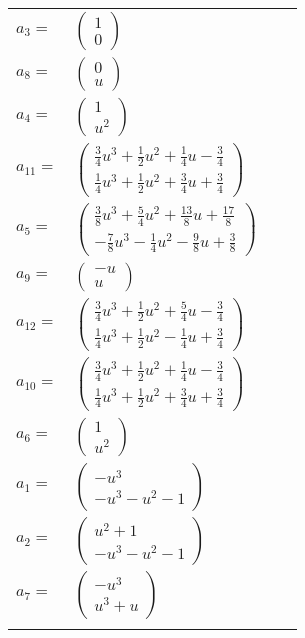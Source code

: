 \documentclass[1p]{elsarticle_modified}
\theoremstyle{definition}
\begin{document}
\begin{tabular}{m{7pt} m{180pt} m{7pt} m{180pt} }
\flushright $a_{3}=$&$\begin{pmatrix}1\\0\end{pmatrix}$ \\
\flushright $a_{8}=$&$\begin{pmatrix}0\\u\end{pmatrix}$ \\
\flushright $a_{4}=$&$\begin{pmatrix}1\\u^2\end{pmatrix}$ \\
\flushright $a_{11}=$&$\begin{pmatrix}\frac{3}{4} u^3+\frac{1}{2} u^2+\frac{1}{4} u-\frac{3}{4}\\\frac{1}{4} u^3+\frac{1}{2} u^2+\frac{3}{4} u+\frac{3}{4}\end{pmatrix}$ \\
\flushright $a_{5}=$&$\begin{pmatrix}\frac{3}{8} u^3+\frac{5}{4} u^2+\frac{13}{8} u+\frac{17}{8}\\-\frac{7}{8} u^3-\frac{1}{4} u^2-\frac{9}{8} u+\frac{3}{8}\end{pmatrix}$ \\
\flushright $a_{9}=$&$\begin{pmatrix}- u\\u\end{pmatrix}$ \\
\flushright $a_{12}=$&$\begin{pmatrix}\frac{3}{4} u^3+\frac{1}{2} u^2+\frac{5}{4} u-\frac{3}{4}\\\frac{1}{4} u^3+\frac{1}{2} u^2-\frac{1}{4} u+\frac{3}{4}\end{pmatrix}$ \\
\flushright $a_{10}=$&$\begin{pmatrix}\frac{3}{4} u^3+\frac{1}{2} u^2+\frac{1}{4} u-\frac{3}{4}\\\frac{1}{4} u^3+\frac{1}{2} u^2+\frac{3}{4} u+\frac{3}{4}\end{pmatrix}$ \\
\flushright $a_{6}=$&$\begin{pmatrix}1\\u^2\end{pmatrix}$ \\
\flushright $a_{1}=$&$\begin{pmatrix}- u^3\\- u^3- u^2-1\end{pmatrix}$ \\
\flushright $a_{2}=$&$\begin{pmatrix}u^2+1\\- u^3- u^2-1\end{pmatrix}$ \\
\flushright $a_{7}=$&$\begin{pmatrix}- u^3\\u^3+u\end{pmatrix}$\\&\end{tabular}
\end{document}
